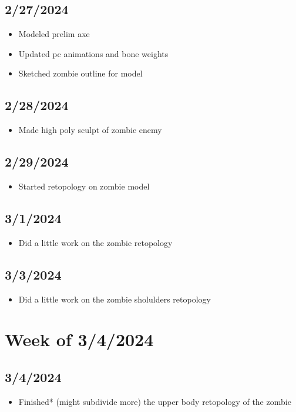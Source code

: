 \documentclass{article}
\begin{document}
\subsection*{2/27/2024}
\begin{itemize}
   \item Modeled prelim axe
   \item Updated pc animations and bone weights
   \item Sketched zombie outline for model
\end{itemize}

\subsection*{2/28/2024}
\begin{itemize}
   \item Made high poly sculpt of zombie enemy
\end{itemize}

\subsection*{2/29/2024}
\begin{itemize}
   \item Started retopology on zombie model
\end{itemize}

\subsection*{3/1/2024}
\begin{itemize}
   \item Did a little work on the zombie retopology
\end{itemize}
\subsection*{3/3/2024}
\begin{itemize}
   \item Did a little work on the zombie sholulders retopology
\end{itemize}

\section*{Week of 3/4/2024}
\subsection*{3/4/2024}
\begin{itemize}
   \item Finished* (might subdivide more) the upper body retopology of the zombie
\end{itemize}
\end{document}
